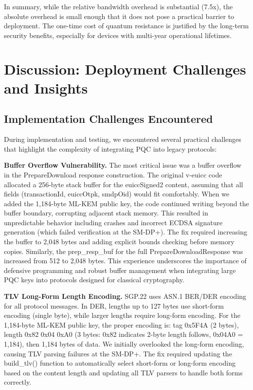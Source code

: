 \documentclass{easychair}
\begin{document}
In summary, while the relative bandwidth overhead is substantial (7.5x), the absolute overhead is small enough that it does not pose a practical barrier to deployment. The one-time cost of quantum resistance is justified by the long-term security benefits, especially for devices with multi-year operational lifetimes.

\section{Discussion: Deployment Challenges and Insights}

\subsection{Implementation Challenges Encountered}

During implementation and testing, we encountered several practical challenges that highlight the complexity of integrating PQC into legacy protocols:

\textbf{Buffer Overflow Vulnerability.} The most critical issue was a buffer overflow in the PrepareDownload response construction. The original v-euicc code allocated a 256-byte stack buffer for the euiccSigned2 content, assuming that all fields (transactionId, euiccOtpk, smdpOid) would fit comfortably. When we added the 1,184-byte ML-KEM public key, the code continued writing beyond the buffer boundary, corrupting adjacent stack memory. This resulted in unpredictable behavior including crashes and incorrect ECDSA signature generation (which failed verification at the SM-DP+). The fix required increasing the buffer to 2,048 bytes and adding explicit bounds checking before memory copies. Similarly, the prep\_resp\_buf for the full PrepareDownloadResponse was increased from 512 to 2,048 bytes. This experience underscores the importance of defensive programming and robust buffer management when integrating large PQC keys into protocols designed for classical cryptography.

\textbf{TLV Long-Form Length Encoding.} SGP.22 uses ASN.1 BER/DER encoding for all protocol messages. In DER, lengths up to 127 bytes use short-form encoding (single byte), while larger lengths require long-form encoding. For the 1,184-byte ML-KEM public key, the proper encoding is: tag 0x5F4A (2 bytes), length 0x82 0x04 0xA0 (3 bytes: 0x82 indicates 2-byte length follows, 0x04A0 = 1,184), then 1,184 bytes of data. We initially overlooked the long-form encoding, causing TLV parsing failures at the SM-DP+. The fix required updating the build\_tlv() function to automatically select short-form or long-form encoding based on the content length and updating all TLV parsers to handle both forms correctly.
\end{document}
